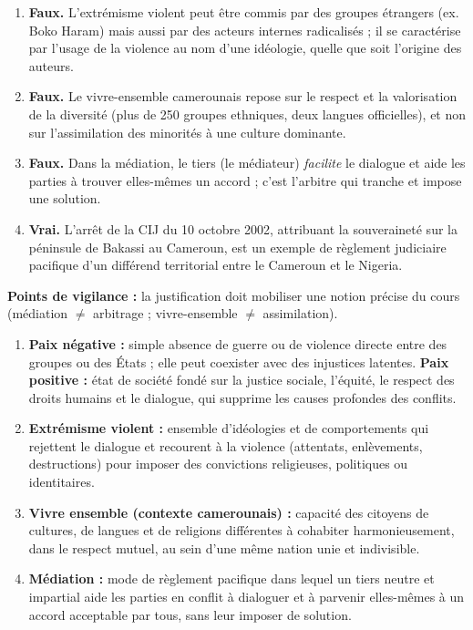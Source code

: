 \documentclass[11pt]{article}
\newcommand{\cle}[1]{{\popxbold\color{popdark}#1}}
\begin{document}
\begin{corrige}
\begin{enumerate}
\item \textbf{Faux.} L'extrémisme violent peut être commis par des groupes étrangers (ex. Boko Haram) mais aussi par des acteurs internes radicalisés ; il se caractérise par l'usage de la violence au nom d'une idéologie, quelle que soit l'origine des auteurs.
\item \textbf{Faux.} Le vivre-ensemble camerounais repose sur le respect et la valorisation de la diversité (plus de 250 groupes ethniques, deux langues officielles), et non sur l'assimilation des minorités à une culture dominante.
\item \textbf{Faux.} Dans la médiation, le tiers (le médiateur) \emph{facilite} le dialogue et aide les parties à trouver elles-mêmes un accord ; c'est l'arbitre qui tranche et impose une solution.
\item \textbf{Vrai.} L'arrêt de la CIJ du 10 octobre 2002, attribuant la souveraineté sur la péninsule de Bakassi au Cameroun, est un exemple de règlement \cle{judiciaire} pacifique d'un différend territorial entre le Cameroun et le Nigeria.
\end{enumerate}
\textbf{Points de vigilance :} la justification doit mobiliser une notion précise du cours (médiation $\neq$ arbitrage ; vivre-ensemble $\neq$ assimilation).
\end{corrige}

\begin{corrige}
\begin{enumerate}
\item \textbf{Paix négative :} simple absence de guerre ou de violence directe entre des groupes ou des États ; elle peut coexister avec des injustices latentes. \textbf{Paix positive :} état de société fondé sur la justice sociale, l'équité, le respect des droits humains et le dialogue, qui supprime les causes profondes des conflits.
\item \textbf{Extrémisme violent :} ensemble d'idéologies et de comportements qui rejettent le dialogue et recourent à la violence (attentats, enlèvements, destructions) pour imposer des convictions religieuses, politiques ou identitaires.
\item \textbf{Vivre ensemble (contexte camerounais) :} capacité des citoyens de cultures, de langues et de religions différentes à cohabiter harmonieusement, dans le respect mutuel, au sein d'une même nation unie et indivisible.
\item \textbf{Médiation :} mode de règlement pacifique dans lequel un tiers neutre et impartial aide les parties en conflit à dialoguer et à parvenir elles-mêmes à un accord acceptable par tous, sans leur imposer de solution.
\end{enumerate}
\end{corrige}
\end{document}
